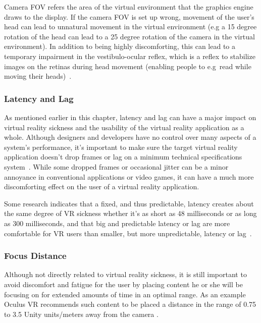 Camera FOV refers the area of the virtual environment that the graphics engine draws to the display.
If the camera FOV is set up wrong, movement of the user's head can lead to unnatural movement in the virtual environment (e.g a 15 degree rotation of the head can lead to a 
25 degree rotation of the camera in the virtual environment). In addition to being highly discomforting, this can lead to a temporary impairment in the vestibulo-ocular reflex, 
which is a reflex to stabilize images on the retinas during head movement (enabling people to e.g~read while moving their heads)~\citep{Stanney2002}.

\subsubsection{Latency and Lag}
As mentioned earlier in this chapter, latency and lag can have a major impact on virtual reality sickness and the usability of the virtual reality application as a whole.
Although designers and developers have no control over many aspects of a system's performance, it's important to make sure the target virtual reality application
doesn't drop frames or lag on a minimum technical specifications system~\citep{OCULUS2016}. While some dropped frames or occasional jitter can be a minor annoyance
in conventional applications or video games, it can have a much more discomforting effect on the user of a virtual reality application. 

Some research indicates that a fixed, and thus predictable, latency creates about the same degree of VR sickness whether it's as short as 48 milliseconds or as long 
as 300 milliseconds, and that big and predictable latency or lag are more comfortable for VR users than smaller, but more unpredictable, latency or lag~\citep{Draper2001}. 

\subsubsection{Focus Distance}
\label{sec:focus_distance}
Although not directly related to virtual reality sickness, it is still important to avoid discomfort and fatigue for the user by placing content he or she will be focusing on 
for extended amounts of time in an optimal range.
As an example Oculus VR recommends such content to be placed a distance in the range of 0.75 to 3.5 Unity units/meters away from the camera \citep{OCULUS2016}. 



